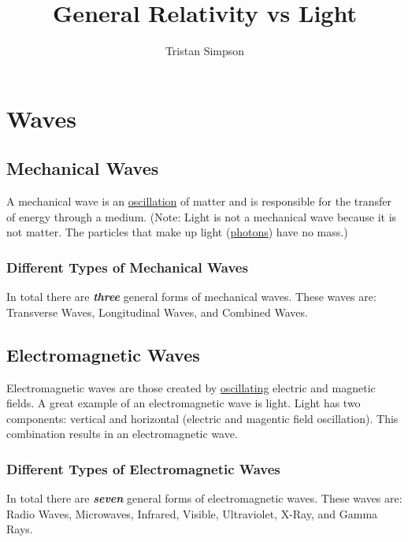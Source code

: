 \documentclass{article}
\title{General Relativity vs Light}
\author{Tristan Simpson}
\begin{document}
\maketitle
\tableofcontents
\section{Waves}
\subsection{Mechanical Waves}
A mechanical wave is an \hyperref[sec:oscillation]{oscillation} of matter and is responsible for the transfer of energy through a medium. (Note: Light is not a mechanical wave because it is not matter. The particles that make up light (\hyperref[sec:photons]{photons}) have no mass.)

\subsubsection{Different Types of Mechanical Waves}
In total there are \textbf{\textit{three}} general forms of mechanical waves. These waves are: Transverse Waves, Longitudinal Waves, and Combined Waves.

\subsection{Electromagnetic Waves}
Electromagnetic waves are those created by \hyperref[sec:oscillation]{oscillating} electric and magnetic fields. A great example of an electromagnetic wave is light. Light has two components: vertical and horizontal (electric and magentic field oscillation). This combination results in an electromagnetic wave.

\subsubsection{Different Types of Electromagnetic Waves}
In total there are \textbf{\textit{seven}} general forms of electromagnetic waves. These waves are: Radio Waves, Microwaves, Infrared, Visible, Ultraviolet, X-Ray, and Gamma Rays.
\end{document}

